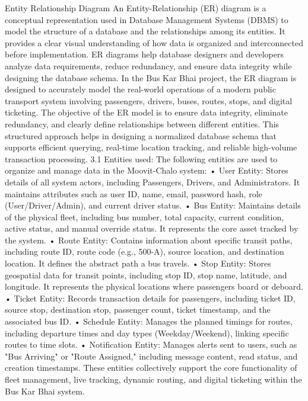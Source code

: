                                        Entity Relationship Diagram
An Entity-Relationship (ER) diagram is a conceptual representation used in Database Management Systems (DBMS) to model the structure of a database and the relationships among its entities. It provides a clear visual understanding of how data is organized and interconnected before implementation. ER diagrams help database designers and developers analyze data requirements, reduce redundancy, and ensure data integrity while designing the database schema.
In the Bus Kar Bhai project, the ER diagram is designed to accurately model the real-world operations of a modern public transport system involving passengers, drivers, buses, routes, stops, and digital ticketing. The objective of the ER model is to ensure data integrity, eliminate redundancy, and clearly define relationships between different entities. This structured approach helps in designing a normalized database schema that supports efficient querying, real-time location tracking, and reliable high-volume transaction processing.
3.1	 Entities used:
The following entities are used to organize and manage data in the Moovit-Chalo system:
•	User Entity: Stores details of all system actors, including Passengers, Drivers, and Administrators. It maintains attributes such as user ID, name, email, password hash, role (User/Driver/Admin), and current driver status.
•	Bus Entity: Maintains details of the physical fleet, including bus number, total capacity, current condition, active status, and manual override status. It represents the core asset tracked by the system.
•	Route Entity: Contains information about specific transit paths, including route ID, route code (e.g., 500-A), source location, and destination location. It defines the abstract path a bus travels.
•	Stop Entity: Stores geospatial data for transit points, including stop ID, stop name, latitude, and longitude. It represents the physical locations where passengers board or deboard.
•	Ticket Entity: Records transaction details for passengers, including ticket ID, source stop, destination stop, passenger count, ticket timestamp, and the associated bus ID.
•	Schedule Entity: Manages the planned timings for routes, including departure times and day types (Weekday/Weekend), linking specific routes to time slots.
•	Notification Entity: Manages alerts sent to users, such as "Bus Arriving" or "Route Assigned," including message content, read status, and creation timestamps.
These entities collectively support the core functionality of fleet management, live tracking, dynamic routing, and digital ticketing within the Bus Kar Bhai system.







